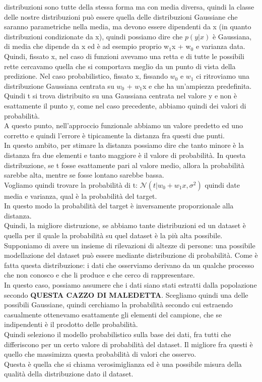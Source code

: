 \documentclass[12pt, oneside]{extbook}
\begin{document}
distribuzioni sono tutte della stessa forma ma con media diversa, quindi la classe delle nostre distribuzioni può essere quella delle distribuzioni Gaussiane che saranno parametriche nella media, ma devono essere dipendenti da x (in quanto distribuzioni condizionate da x), quindi possiamo dire che $p(y|x)$ è Gaussiana, di media che dipende da x ed è ad esempio proprio w$_1$x + w$_0$ e varianza data.\\Quindi, fissato x, nel caso di funzioni avevamo una retta e di tutte le possibili rette cercavamo quella che si comportava meglio da un punto di vista della predizione. Nel caso probabilistico, fissato x, fissando $w_0$ e $w_1$ ci ritroviamo una distribuzione Gaussiana centrata su $w_0$ + $w_1$x e che ha un'ampiezza predefinita.\\Quindi t si trova distribuito su una Gaussiana centrata nel valore y e non è esattamente il punto y, come nel caso precedente, abbiamo quindi dei valori di probabilità.\\A questo punto, nell'approccio funzionale abbiamo un valore predetto ed uno corretto e quindi l'errore è tipicamente la distanza fra questi due punti.\\In questo ambito, per stimare la distanza possiamo dire che tanto minore è la distanza fra due elementi e tanto maggiore è il valore di probabilità. In questa distribuzione, se t fosse esattamente pari al valore medio, allora la probabilità sarebbe alta, mentre se fosse lontano sarebbe bassa.\\Vogliamo quindi trovare la probabilità di t: $\mathscr{N}(t | w_0 + w_1x, \sigma^2)$ quindi date media e varianza, qual è la probabilità del target.\\In questo modo la probabilità del target è inversamente proporzionale alla distanza.\\Quindi, la migliore distruzione, se abbiamo tante distribuzioni ed un dataset è quella per il quale la probabilità su quel dataset è la più alta possibile.\\Supponiamo di avere un insieme di rilevazioni di altezze di persone: una possibile modellazione del dataset può essere mediante distribuzione di probabilità. Come è fatta questa distribuzione: i dati che osserviamo derivano da un qualche processo che non conosco e che li produce e che cerco di rappresentare.\\In questo caso, possiamo assumere che i dati siano stati estratti dalla popolazione secondo \textsf{\textbf{QUESTA CAZZO DI MALEDETTA}}. Scegliamo quindi una delle possibili Gaussiane, quindi cerchiamo la probabilità secondo cui estraendo casualmente ottenevamo esattamente gli elementi del campione, che se indipendenti è il prodotto delle probabilità.\\Quindi seleziono il modello probabilistico sulla base dei dati, fra tutti che differiscono per un certo valore di probabilità del dataset. Il migliore fra questi è quello che massimizza questa probabilità di valori che osservo.\\Questa è quella che si chiama verosimiglianza ed è una possibile misura della qualità della distribuzione dato il dataset.\\
\end{document}

